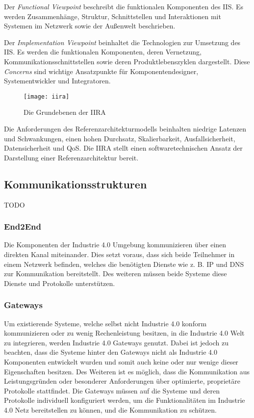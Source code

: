 Der \textit{Functional Viewpoint} beschreibt die funktionalen Komponenten des \ac{IIS}. Es werden Zusammenhänge, Struktur, Schnittstellen und Interaktionen mit Systemen im Netzwerk sowie der Außenwelt beschrieben.

Der \textit{Implementation Viewpoint} beinhaltet die Technologien zur Umsetzung des \ac{IIS}. Es werden die funktionalen Komponenten, deren Vernetzung, Kommunikationsschnittstellen sowie deren Produktlebenszyklen dargestellt. Diese \textit{Concerns} sind wichtige Ansatzpunkte für Komponentendesigner, Systementwickler und Integratoren. 

\begin{figure}[h]
  \centering
  \texttt{[image: iira]}
  \caption{Die Grundebenen der IIRA} 
  \label{Grundlagen:IIAF/IIRA - Übersicht}
\end{figure}

\clearpage

Die Anforderungen des Referenzarchitekturmodells beinhalten niedrige Latenzen und Schwankungen, einen hohen Durchsatz, Skalierbarkeit, Ausfallsicherheit, Datensicherheit und \ac{QoS}. Die \ac{IIRA} stellt einen softwaretechnischen Ansatz der Darstellung einer Referenzarchitektur bereit.

\subsection{Kommunikationsstrukturen}
\label{Grundlagen:Kommunikationsstrukturen}
TODO

\subsubsection{End2End}
\label{Grundlagen:End2End}
Die Komponenten der Industrie 4.0 Umgebung kommunizieren über einen direkten Kanal miteinander. Dies setzt voraus, dass sich beide Teilnehmer in einem Netzwerk befinden, welches die benötigten Dienste wie z. B. \ac{IP} und \ac{DNS} zur Kommunikation bereitstellt. Des weiteren müssen beide Systeme diese Dienste und Protokolle unterstützen.

\subsubsection{Gateways}
Um existierende Systeme, welche selbst nicht Industrie 4.0 konform kommunizieren oder zu wenig Rechenleistung besitzen, in die Industrie 4.0 Welt zu integrieren, werden Industrie 4.0 Gateways genutzt. Dabei ist jedoch zu beachten, dass die Systeme hinter den Gateways nicht als Industrie 4.0 Komponenten entwickelt wurden und somit auch keine oder nur wenige dieser Eigenschaften besitzen. Des Weiteren ist es möglich, dass die Kommunikation aus Leistungsgründen oder besonderer Anforderungen über optimierte, proprietäre Protokolle stattfindet. Die Gateways müssen auf die Systeme und deren Protokolle individuell konfiguriert werden, um die Funktionalitäten im Industrie 4.0 Netz bereitstellen zu können, und die Kommunikation zu schützen.

